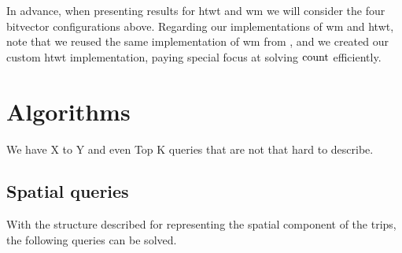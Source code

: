 	In advance, when presenting results for \gls{htwt} and \gls{wm} we will consider the four bitvector configurations
	above. Regarding our implementations of \gls{wm} and \gls{htwt}, note that we reused the same implementation of \gls{wm} from \cite{CNO15}, 
	and we created our custom \gls{htwt} implementation, paying special focus at solving $\operatorname{count}$ efficiently.

\section{Algorithms}
	We have X to Y and even Top K queries that are not that hard to describe.

	\subsection{Spatial queries}
	\label{sec:sq}

	With the structure described for representing the spatial component of the trips,
	the following queries can be solved.

